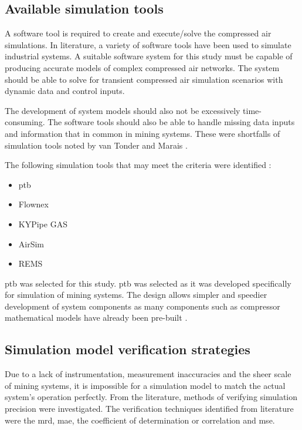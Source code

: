 \subsection{Available simulation tools}
A software tool is required to create and execute/solve the compressed air simulations. In literature, a variety of software tools have been used to simulate industrial systems. A suitable software system for this study must be capable of producing accurate models of complex compressed air networks. The system should be able to solve for transient compressed air simulation scenarios with dynamic data and control inputs.
\par 
The development of system models should also not be excessively time-consuming. The software tools should also be able to handle missing data inputs and information that in common in mining systems. These were shortfalls of simulation tools noted by van Tonder \cite{vanTonder2014PhD} and Marais \cite{Mare2016PhD}.
\par
The following simulation tools that may meet the criteria were identified : 
\begin{itemize}
	\item \gls{ptb}
	\item Flownex
	\item KYPipe GAS
	\item AirSim
	\item REMS
\end{itemize}
 \gls{ptb} was selected for this study. \gls{ptb} was selected as it was developed specifically for simulation of mining systems. The design allows simpler and speedier development of system components as many components such as compressor mathematical models have already been pre-built \cite{Mare2016PhD}. 
 	\subsection{Simulation model verification strategies}\label{VerificationLit}
 	Due to a lack of instrumentation, measurement inaccuracies and the sheer scale of mining systems, it is impossible for a simulation model to match the actual system's operation perfectly. From the literature, methods of verifying simulation precision were investigated. The verification techniques identified from literature were the \gls{mrd}, \gls{mae},  the coefficient of determination or correlation and \gls{mse}.%
